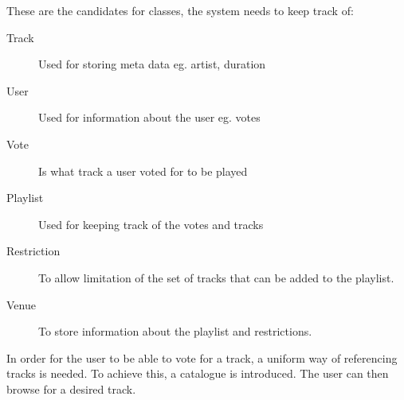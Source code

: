 These are the candidates for classes, the system needs to keep track of:
\begin{description}
    \item[Track]

    Used for storing meta data eg. artist, duration
    \item[User]

    Used for information about the user eg. votes
    \item[Vote]

    Is what track a user voted for to be played
    \item[Playlist]

    Used for keeping track of the votes and tracks
    \item[Restriction]

    To allow limitation of the set of tracks that can be added to the playlist.
    \item[Venue]

    To store information about the playlist and restrictions.
\end{description}

In order for the user to be able to vote for a track, a uniform way of referencing tracks is needed. To achieve this, a catalogue is introduced. The user can then browse for a desired track.
